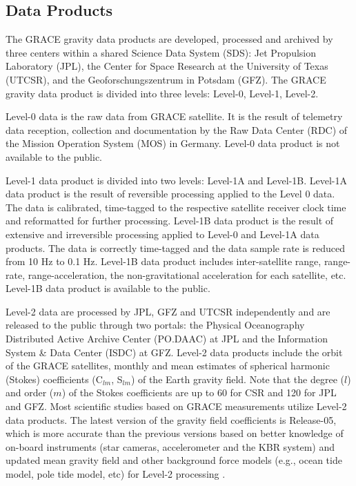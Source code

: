 \subsection{Data Products}
The GRACE gravity data products are developed, processed and archived by three centers within a shared Science Data System (SDS): Jet Propulsion Laboratory (JPL), the Center for Space Research at the University of Texas (UTCSR), and the Geoforschungszentrum in Potsdam (GFZ).  The GRACE gravity data product is divided into three levels: Level-0, Level-1, Level-2.  

Level-0 data is the raw data from GRACE satellite.  It is the result of telemetry data reception, collection and documentation by the Raw Data Center (RDC) of the Mission Operation System (MOS) in Germany. Level-0 data product is not available to the public.  

Level-1 data product is divided into two levels: Level-1A and Level-1B.  Level-1A data product is the result of reversible processing applied to the Level 0 data.  The data is calibrated, time-tagged to the respective satellite receiver clock time and reformatted for further processing.  Level-1B data product is the result of extensive and irreversible processing applied to Level-0 and Level-1A data products.  The data is correctly time-tagged and the data sample rate is reduced from 10 Hz to 0.1 Hz.  Level-1B data product includes inter-satellite range, range-rate, range-acceleration, the non-gravitational acceleration for each satellite, etc.  Level-1B data product is available to the public.  

Level-2 data are processed by JPL, GFZ and UTCSR independently and are released to the public through two portals: the Physical Oceanography Distributed Active Archive Center (PO.DAAC) at JPL and the Information System \& Data Center (ISDC) at GFZ.   Level-2 data products include the orbit of the GRACE satellites, monthly and mean estimates of spherical harmonic (Stokes) coefficients (C$_{lm}$, S$_{lm}$) of the Earth gravity field.  Note that the degree ($l$) and order ($m$) of the Stokes coefficients are up to 60 for CSR and 120 for JPL and GFZ.  Most scientific studies based on GRACE measurements utilize Level-2 data products.  The latest version of the gravity field coefficients is Release-05, which is more accurate than the previous versions based on better knowledge of on-board instruments (star cameras, accelerometer and the KBR system) and updated mean gravity field and other background force models (e.g., ocean tide model, pole tide model, etc) for Level-2 processing \cite[]{chambers2012chpt2}.  

